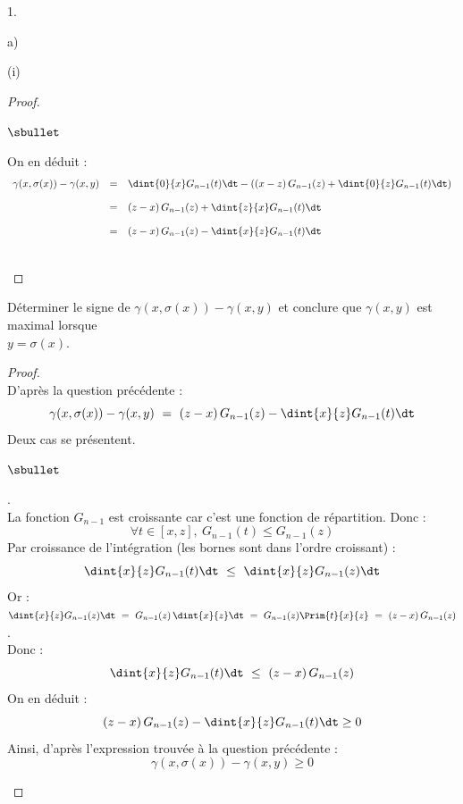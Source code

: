 \begin{noliste}{1.}
\begin{noliste}{a)}
\begin{nonoliste}{(i)}
\begin{proof}
\begin{noliste}{$\sbullet$}
	  \item On en déduit :
	  \[
	    \begin{array}{rcl}
	      \gamma(x, \sigma(x)) - \gamma(x,y) & = & 
	      \dint{0}{x} G_{n-1}(t) \dt - \left( (x-z) \, G_{n-1}(z)
	      + \dint{0}{z} G_{n-1}(t) \dt\right)
	      \\[.4cm]
	      & = & (z-x) \, G_{n-1}(z) + \dint{z}{x} G_{n-1}(t) \dt
	      \\[.4cm]
	      & = & (z-x) \, G_{n-1}(z) - \dint{x}{z} G_{n-1}(t) \dt
	    \end{array}
	  \]
        \end{noliste}
        ~\\[-1cm]
      \end{proof}
      
      
      \newpage

      
      \item Déterminer le signe de $\gamma(x, \sigma(x)) - 
      \gamma(x,y)$ et conclure que $\gamma(x,y)$ est maximal lorsque\\ 
      $y = \sigma(x)$.
      
      \begin{proof}~\\
      D'après la question précédente :
      \[
        \gamma(x, \sigma(x)) - \gamma(x,y) \ = \
        (z-x) \, G_{n-1}(z) - \dint{x}{z} G_{n-1}(t) \dt
      \]
      Deux cas se présentent.
        \begin{noliste}{$\sbullet$}
	  \item {}.\\
	  La fonction $G_{n-1}$ est croissante car c'est une fonction
	  de répartition. Donc :
	  \[
	    \forall t \in [x,z], \ G_{n-1}(t) \leq G_{n-1}(z)
	  \]
	  Par croissance de l'intégration (les bornes sont 
	  dans l'ordre croissant) :
	  \[
	    \dint{x}{z} G_{n-1}(t) \dt \ \leq \ 
	    \dint{x}{z} G_{n-1}(z) \dt
	  \]
	  Or : $\dint{x}{z} G_{n-1}(z) \dt \ = \ G_{n-1}(z) \,
	  \dint{x}{z} \dt \ = \ G_{n-1}(z) \Prim{t}{x}{z} \ = \
	  (z-x) \, G_{n-1}(z)$.\\[.1cm]
	  Donc : 
	  \[
	    \dint{x}{z} G_{n-1}(t) \dt \ \leq \ (z-x) \, G_{n-1}(z)
	  \]
	  On en déduit :
	  \[
	    (z-x) \, G_{n-1}(z) - \dint{x}{z} G_{n-1}(t) \dt \geq 0
	  \]
	  Ainsi, d'après l'expression trouvée à la question 
	  précédente :
	  \[
	    \gamma(x, \sigma(x)) - \gamma(x,y) \geq 0
	  \]
	  

\end{noliste}
\end{proof}
\end{nonoliste}
\end{noliste}
\end{noliste}
